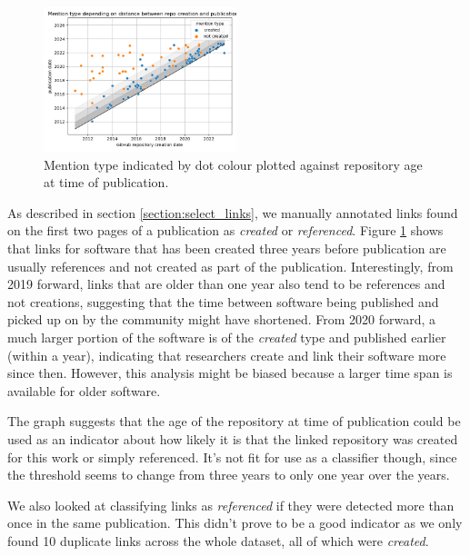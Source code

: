 \documentclass[10pt,a4paper]{scrartcl}
\begin{document}
\begin{figure}[h]
    \centering
    \includegraphics[width=0.5\textwidth]{../analysis/overall/mention_type_timeline.png}
    \caption{Mention type indicated by dot colour plotted against repository age at time of publication.}
    \label{fig:mention_type_time}
\end{figure}

As described in section \ref{section:select_links}, we manually annotated links found on the first two pages of a publication as \textit{created} or \textit{referenced}.
Figure \ref{fig:mention_type_time} shows that links for software that has been created three years before publication are usually references and not created as part of the publication.
Interestingly, from 2019 forward, links that are older than one year also tend to be references and not creations,
suggesting that the time between software being published and picked up on by the community might have shortened. 
From 2020 forward, a much larger portion of the software is of the \textit{created} type and published earlier (within a year),
indicating that researchers create and link their software more since then.
However, this analysis might be biased because a larger time span is available for older software.


The graph suggests that the age of the repository at time of publication could be used as
an indicator about how likely it is that the linked repository was created for this work or simply referenced.
It's not fit for use as a classifier though, since the threshold seems to change from three years to only one year over the years.

We also looked at classifying links as \textit{referenced} if they were detected more than once in the same publication.
This didn't prove to be a good indicator as we only found 10 duplicate links across the whole dataset, all of which were \textit{created}.
\end{document}
